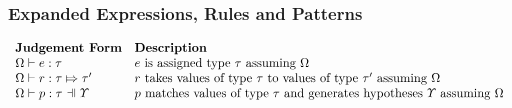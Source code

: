 \subsubsection{Expanded Expressions, Rules and Patterns}
\[\begin{array}{ll}
\textbf{Judgement Form} & \textbf{Description}\\
\hastypeP{\Omega}{e}{\tau} & \text{$e$ is assigned type $\tau$ assuming $\Omega$}\\
\ruleTypeP{\Omega}{r}{\tau}{\tau'} & \text{$r$ takes values of type $\tau$ to values of type $\tau'$ assuming $\Omega$}\\
\patTypeP{\pctx}{p}{\tau} & \text{$p$ matches values of type $\tau$ and generates hypotheses $\pctx$ assuming $\Omega$} 
\end{array}\]

